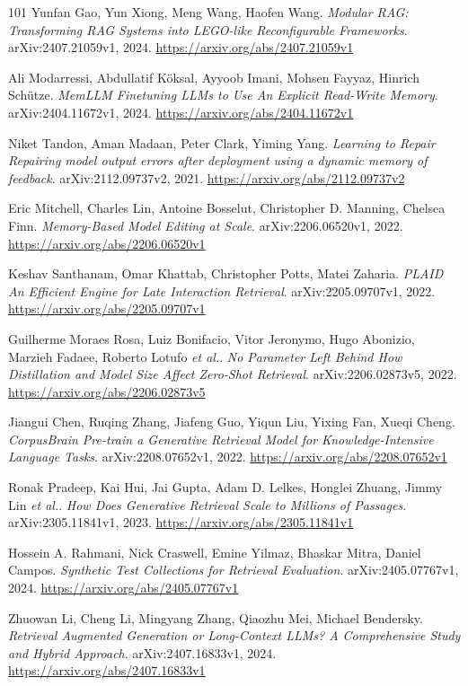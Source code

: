 \documentclass[11pt,a4paper]{article}
\begin{document}
\begin{thebibliography}{101}
Yunfan Gao, Yun Xiong, Meng Wang, Haofen Wang.
\newblock \emph{Modular RAG: Transforming RAG Systems into LEGO-like Reconfigurable Frameworks}.
\newblock arXiv:2407.21059v1, 2024.
\newblock \url{https://arxiv.org/abs/2407.21059v1}

Ali Modarressi, Abdullatif K\"{o}ksal, Ayyoob Imani, Mohsen Fayyaz, Hinrich Sch\"{u}tze.
\newblock \emph{MemLLM Finetuning LLMs to Use An Explicit Read-Write Memory}.
\newblock arXiv:2404.11672v1, 2024.
\newblock \url{https://arxiv.org/abs/2404.11672v1}

Niket Tandon, Aman Madaan, Peter Clark, Yiming Yang.
\newblock \emph{Learning to Repair Repairing model output errors after deployment using a dynamic memory of feedback}.
\newblock arXiv:2112.09737v2, 2021.
\newblock \url{https://arxiv.org/abs/2112.09737v2}

Eric Mitchell, Charles Lin, Antoine Bosselut, Christopher D. Manning, Chelsea Finn.
\newblock \emph{Memory-Based Model Editing at Scale}.
\newblock arXiv:2206.06520v1, 2022.
\newblock \url{https://arxiv.org/abs/2206.06520v1}

Keshav Santhanam, Omar Khattab, Christopher Potts, Matei Zaharia.
\newblock \emph{PLAID An Efficient Engine for Late Interaction Retrieval}.
\newblock arXiv:2205.09707v1, 2022.
\newblock \url{https://arxiv.org/abs/2205.09707v1}

Guilherme Moraes Rosa, Luiz Bonifacio, Vitor Jeronymo, Hugo Abonizio, Marzieh Fadaee, Roberto Lotufo \emph{et al.}.
\newblock \emph{No Parameter Left Behind How Distillation and Model Size Affect Zero-Shot Retrieval}.
\newblock arXiv:2206.02873v5, 2022.
\newblock \url{https://arxiv.org/abs/2206.02873v5}

Jiangui Chen, Ruqing Zhang, Jiafeng Guo, Yiqun Liu, Yixing Fan, Xueqi Cheng.
\newblock \emph{CorpusBrain Pre-train a Generative Retrieval Model for Knowledge-Intensive Language Tasks}.
\newblock arXiv:2208.07652v1, 2022.
\newblock \url{https://arxiv.org/abs/2208.07652v1}

Ronak Pradeep, Kai Hui, Jai Gupta, Adam D. Lelkes, Honglei Zhuang, Jimmy Lin \emph{et al.}.
\newblock \emph{How Does Generative Retrieval Scale to Millions of Passages}.
\newblock arXiv:2305.11841v1, 2023.
\newblock \url{https://arxiv.org/abs/2305.11841v1}

Hossein A. Rahmani, Nick Craswell, Emine Yilmaz, Bhaskar Mitra, Daniel Campos.
\newblock \emph{Synthetic Test Collections for Retrieval Evaluation}.
\newblock arXiv:2405.07767v1, 2024.
\newblock \url{https://arxiv.org/abs/2405.07767v1}

Zhuowan Li, Cheng Li, Mingyang Zhang, Qiaozhu Mei, Michael Bendersky.
\newblock \emph{Retrieval Augmented Generation or Long-Context LLMs? A Comprehensive Study and Hybrid Approach}.
\newblock arXiv:2407.16833v1, 2024.
\newblock \url{https://arxiv.org/abs/2407.16833v1}

\end{thebibliography}
\end{document}
